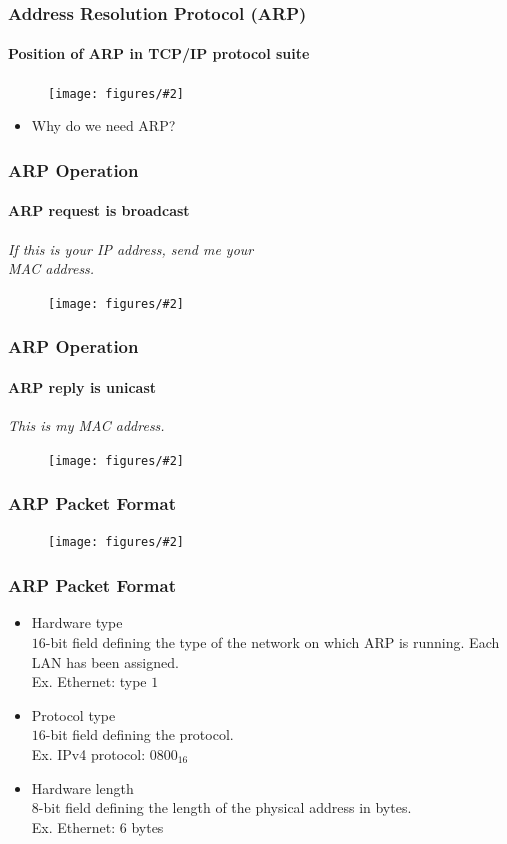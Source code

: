 \documentclass{beamer}
\newcommand{\fig}[2]{
\begin{center}
\begin{figure}
\texttt{[image: figures/\#2]}
\end{figure}
\end{center}
}
\newcommand{\dquote}[1]{\ding{125} \emph{#1} \ding{126}} %
\begin{document}
\begin{frame}
\frametitle{\huge Address Resolution Protocol (ARP)} 
\framesubtitle{Position of ARP in TCP/IP protocol suite}
\fig{0.55}{network_arp}
 \begin{itemize} 
\Large
\item <2-> Why do we need ARP?
\end{itemize}
\end{frame}


\begin{frame}
\frametitle{\huge ARP Operation} 
\framesubtitle{ARP request is broadcast}
\dquote{If this is your IP address, send me your \\ MAC address.}
\fig{0.45}{network_arpop1}
\end{frame}


\begin{frame}
\frametitle{\huge ARP Operation} 
\framesubtitle{ARP reply is unicast}
\dquote{This is my MAC address.}
\fig{0.45}{network_arpop2}
\end{frame}




\begin{frame}
\frametitle{\huge ARP Packet Format} 
\fig{0.55}{network_arppacket}
\end{frame}


\begin{frame}
\frametitle{\huge ARP Packet Format} 
\Large
 \begin{itemize} 
\item <1->  Hardware type \\ $16$-bit field defining the type of the network on which ARP is running. Each LAN has been assigned. \\ 
\quad Ex. Ethernet: type $1$
\item <2-> Protocol type \\ $16$-bit field defining the protocol. \\ 
\quad Ex. IPv4 protocol: $0800_{16}$  
\item <3-> Hardware length \\  8-bit field defining the length of the physical address in bytes. \\ 
\quad Ex. Ethernet: $6$ bytes 
\end{itemize}
\end{frame}
\end{document}
